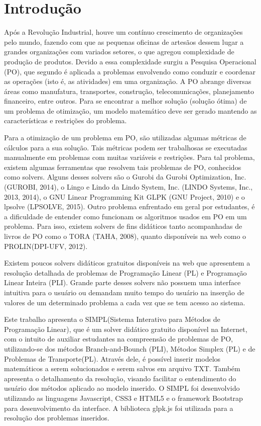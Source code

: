 \documentclass [11pt]{articleSBPO}
\begin{document}
\newpage %

\section{Introdução}\label{sec:introducao}

Após a Revolução Industrial, houve um contínuo crescimento de organizações pelo mundo, fazendo com que as pequenas oficinas de artesãos dessem lugar a grandes organizações com variados setores, o que agregou complexidade de produção de produtos. Devido a essa complexidade surgiu a Pesquisa Operacional (PO), que segundo \cite{hillier; lieberman, 2013} é aplicada a problemas envolvendo como conduzir e coordenar as operações (isto é, as atividades) em uma organização. A PO abrange diversas áreas como manufatura, transportes, construção, telecomunicações, planejamento financeiro, entre outros. Para se encontrar a melhor solução (solução ótima) de um problema de otimização, um modelo matemático deve ser gerado mantendo as características e restrições do problema.

Para a otimização de um problema em PO, são utilizadas algumas métricas de cálculos para a sua solução. Tais métricas podem ser trabalhosas se executadas manualmente em problemas com muitas variáveis e restrições. Para tal problema, existem algumas ferramentas que resolvem tais problemas de PO, conhecidos como solvers. Alguns desses solvers são o Gurobi da Gurobi Optimization, Inc. (GUROBI, 2014), o Lingo e Lindo da Lindo System, Inc. (LINDO Systems, Inc., 2013, 2014), o GNU Linear Programming Kit GLPK (GNU Project, 2010) e o lpsolve (LPSOLVE, 2015). Outro problema enfrentado em geral por estudantes, é a dificuldade de entender como funcionam os algoritmos usados em PO em um problema. Para isso, existem solvers de fins didáticos tanto acompanhadas de livros de PO como o TORA (TAHA, 2008), quanto disponíveis na web como o PROLIN(DPI-UFV, 2012). 

Existem poucos solvers didáticos gratuitos disponíveis na web que apresentem a resolução detalhada de problemas de Programação Linear (PL) e Programação Linear Inteira (PLI). Grande parte desses solvers não possuem uma interface intuitiva para o usuário ou demandam muito tempo do usuário na inserção de valores de um determinado problema a cada vez que se tem acesso ao sistema.

Este trabalho apresenta o SIMPL(Sistema Interativo para Métodos de Programação Linear), que é um solver didático gratuito disponível na Internet, com o intuito de auxiliar estudantes na compreensão de problemas de PO, utilizando-se dos métodos Branch-and-Bounch (PLI), Métodos Simplex (PL) e de Problemas de Transporte(PL). Através dele, é possível inserir modelos matemáticos a serem solucionados e serem salvos em arquivo TXT. Também apresenta o detalhamento da resolução, visando facilitar o entendimento do usuário dos métodos aplicado ao modelo inserido. O SIMPL foi desenvolvido utilizando as linguagens Javascript, CSS3 e HTML5 e o framework Bootstrap para desenvolvimento da interface. A biblioteca glpk.js foi utilizada para a resolução dos problemas inseridos.
\end{document}
